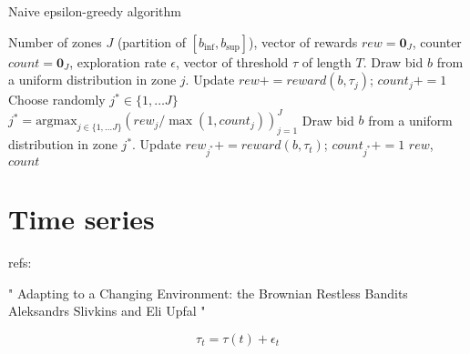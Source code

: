 \documentclass[11pt]{article}
\begin{document}
\begin{algorithm}[H]
  \caption{Naive epsilon-greedy algorithm}
  \label{code:epsilon_greedy}
  \begin{algorithmic}[0]
  \Require Number of zones $J$ (partition of $[b_{\inf}, b_{\sup}]$), vector of rewards $rew = \mathbf{0}_J$, counter $count = \mathbf{0}_J$, exploration rate $\epsilon$,
  vector of threshold $\tau$ of length $T$.
   
  \State Draw bid $b$ from a uniform distribution in zone $j$.
  \State Update $rew += reward(b, \tau_j)$; $count_j += 1$
  \EndFor
   
  \State Choose randomly $j^* \in \{1, \dots J\}$
  \Else {}
  \State $j^* = \text{argmax}_{j \in \{1, \dots J\}} (rew_j / \max(1, count_j))_{j=1}^J$
  \EndIf
  \State Draw bid $b$ from a uniform distribution in zone $j^*$.
  \State Update $rew_{j^*} += reward(b, \tau_t)$; $count_{j^*} += 1$
  \EndFor
  \State \Return $rew$, $count$
\end{algorithmic}
\end{algorithm}

\section{Time series}
refs:

"
Adapting to a Changing Environment: the Brownian Restless Bandits
Aleksandrs Slivkins
and Eli Upfal
"

$$\tau_t = \tau(t) + \epsilon_t$$ 
\newpage
%
\end{document}
